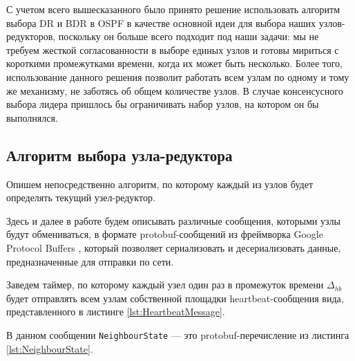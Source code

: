С учетом всего вышесказанного было принято решение использовать алгоритм выбора DR и BDR в OSPF в качестве основной идеи для выбора наших узлов-редукторов, поскольку он больше всего подходит под наши задачи: мы не требуем жесткой согласованности в выборе единых узлов и готовы мириться с короткими промежутками времени, когда их может быть несколько. Более того, использование данного решения позволит работать всем узлам по одному и тому же механизму, не заботясь об общем количестве узлов. В случае консенсусного выбора лидера пришлось бы ограничивать набор узлов, на котором он бы выполнялся.

\subsection{Алгоритм выбора узла-редуктора}
\label{ReducersElectionSubsection}

Опишем непосредственно алгоритм, по которому каждый из узлов будет определять текущий узел-редуктор.

Здесь и далее в работе будем описывать различные сообщения, которыми узлы будут обмениваться, в формате protobuf-сообщений из фреймворка Google Protocol Buffers \cite{Google_protobuf}, который позволяет сериализовать и десериализовать данные, предназначенные для отправки по сети.

Заведем таймер, по которому каждый узел один раз в промежуток времени $\Delta_{hb}$ будет отправлять всем узлам собственной площадки heartbeat-со\-об\-ще\-ния вида, представленного в листинге \ref{lst:HeartbeatMessage}.


В данном сообщении \texttt{NeighbourState} --- это protobuf-перечисление из листинга \ref{lst:NeighbourState}.


